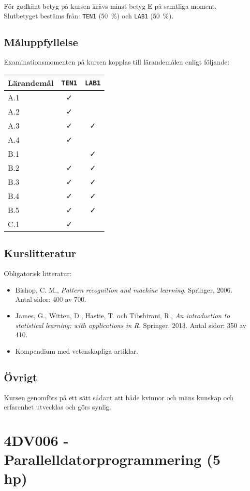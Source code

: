 För godkänt betyg på kursen krävs minst betyg E på samtliga moment.
Slutbetyget bestäms från: \texttt{TEN1} (50~\%) och \texttt{LAB1} (50~\%).

\subsection*{Måluppfyllelse}

Examinationsmomenten på kursen kopplas till lärandemålen enligt
följande:

\begin{longtable}[]{@{}lcc@{}}
\toprule
\textsf{Lärandemål} & \texttt{TEN1} & \texttt{LAB1}\tabularnewline
\midrule
\endhead
A.1 & \faCheck &\tabularnewline
A.2 & \faCheck &\tabularnewline
A.3 & \faCheck & \faCheck\tabularnewline
A.4 & \faCheck &\tabularnewline
B.1 & & \faCheck\tabularnewline
B.2 & \faCheck & \faCheck\tabularnewline
B.3 & \faCheck & \faCheck\tabularnewline
B.4 & \faCheck & \faCheck\tabularnewline
B.5 & \faCheck & \faCheck\tabularnewline
C.1 & \faCheck &\tabularnewline
\bottomrule
\end{longtable}

\subsection*{Kurslitteratur}

Obligatorisk litteratur:

\begin{itemize}
\tightlist
\item
  Bishop, C. M., \emph{Pattern recognition and machine learning}.
  Springer, 2006. Antal sidor: 400 av 700.
\item
  James, G., Witten, D., Hastie, T. och Tibshirani, R., \emph{An
  introduction to statistical learning: with applications in R},
  Springer, 2013. Antal sidor: 350 av 410.
\item
  Kompendium med vetenskapliga artiklar.
\end{itemize}

\subsection*{Övrigt}

Kursen genomförs på ett sätt sådant att både kvinnor och mäns kunskap och erfarenhet utvecklas och görs synlig.
\pagebreak
\section*{4DV006 - Parallelldatorprogrammering (5 hp)}

